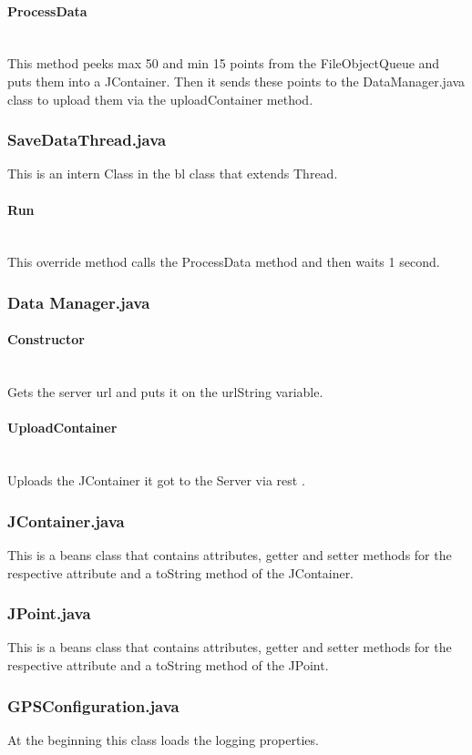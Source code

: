 \paragraph{ProcessData}\mbox{}\\
This method peeks max 50 and min 15 points from the FileObjectQueue and puts them into a JContainer. Then it sends these points to the DataManager.java class to upload them via the uploadContainer method.
\subsubsection{SaveDataThread.java}
This is an intern Class in the \gls{bl} class that extends Thread.
\paragraph{Run}\mbox{}\\
This override method calls the ProcessData method and then waits 1 second.
\subsubsection{Data Manager.java}
\paragraph{Constructor}\mbox{}\\
Gets the server \gls{url} and puts it on the urlString variable.
\paragraph{UploadContainer}\mbox{}\\
Uploads the JContainer it got to the Server via \gls{rest} .
\subsubsection{JContainer.java}
This is a beans class that contains attributes, getter and setter methods for the respective attribute and a toString method of the JContainer.
\subsubsection{JPoint.java}
This is a beans class that contains attributes, getter and setter methods for the respective attribute and a toString method of the JPoint.
\subsubsection{GPSConfiguration.java}
At the beginning this class loads the logging properties.
